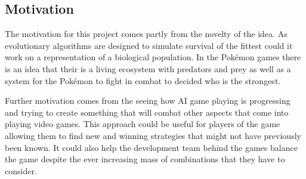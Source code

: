 \documentclass[a4paper]{article}
\newcommand{\Pokemon}{Pok\'{e}mon}
\begin{document}
\subsection{Motivation}
\par
The motivation for this project comes partly from the novelty of the idea.
As evolutionary algorithms are designed to simulate survival of the fittest could it work on a representation of a biological population.
In the \Pokemon{} games there is an idea that their is a living ecosystem with predators and prey as well as a system for the \Pokemon{} to fight in combat to decided who is the strongest.
\par
Further motivation comes from the seeing how AI game playing is progressing and trying to create something that will combat other aspects that come into playing video games.
This approach could be useful for players of the game allowing them to find new and winning strategies that might not have previously been known.
It could also help the development team behind the games balance the game despite the ever increasing mass of combinations that they have to consider.
\end{document}
